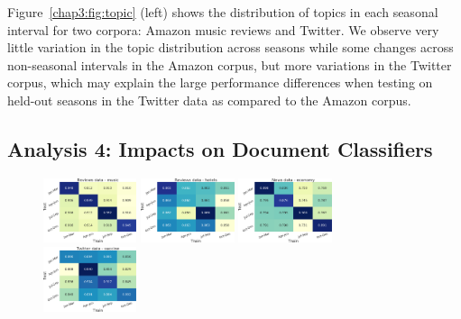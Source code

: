 Figure~\ref{chap3:fig:topic} (left) shows the distribution of topics in each seasonal interval for two corpora: Amazon music reviews and Twitter.
We observe very little variation in the topic distribution across seasons while some changes across non-seasonal intervals in the Amazon corpus, but more variations in the Twitter corpus, which may explain the large performance differences when testing on held-out seasons in the Twitter data as compared to the Amazon corpus.


\subsection{Analysis 4: Impacts on Document Classifiers}

\begin{figure}[tb!]
\centering
\includegraphics[width=0.244\textwidth]{images/chapter3/acl2018/month_amazon}
\includegraphics[width=0.244\textwidth]{images/chapter3/acl2018/month_hotel}
\includegraphics[width=0.244\textwidth]{images/chapter3/acl2018/month_economy}
\includegraphics[width=0.244\textwidth]{images/chapter3/acl2018/month_vaccine} \\

\vspace{2ex}


\end{figure}
